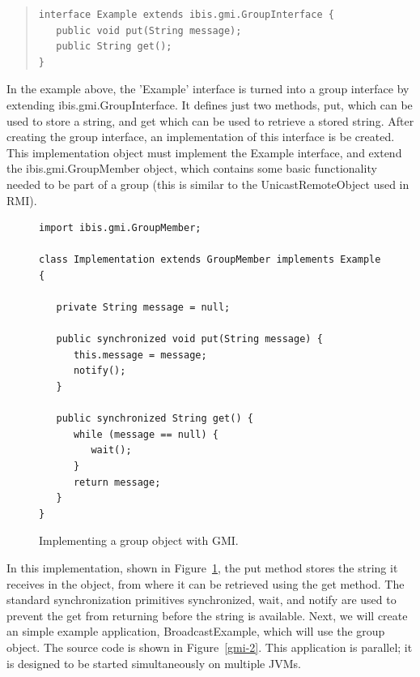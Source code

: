 \documentclass[10pt]{article}
\begin{document}
{\small
\begin{quote}
\begin{verbatim}
interface Example extends ibis.gmi.GroupInterface {
   public void put(String message);
   public String get();
}
\end{verbatim}
\end{quote}
}
\noindent

In the example above, the 'Example' interface is turned into a group
interface by extending ibis.gmi.GroupInterface. It defines just two
methods, put, which can be used to store a string, and get which can
be used to retrieve a stored string.  After creating the group
interface, an implementation of this interface is be created. This
implementation object must implement the Example interface, and extend
the ibis.gmi.GroupMember object, which contains some basic
functionality needed to be part of a group (this is similar to the
UnicastRemoteObject used in RMI).

\begin{figure}[t!]
{\small
\begin{verbatim}
import ibis.gmi.GroupMember;

class Implementation extends GroupMember implements Example {

   private String message = null;

   public synchronized void put(String message) {
      this.message = message;
      notify();
   }
   
   public synchronized String get() { 
      while (message == null) { 
         wait();
      }       
      return message;
   } 
}
\end{verbatim}
}
\caption{Implementing a group object with GMI.}
\label{gmi-1}
\end{figure}

In this implementation, shown in Figure~\ref{gmi-1}, the put method stores the
string it receives in the object, from where it can be retrieved using
the get method. The standard synchronization primitives synchronized,
wait, and notify are used to prevent the get from returning before the
string is available.  Next, we will create an simple example
application, BroadcastExample, which will use the group object. The
source code is shown in Figure~\ref{gmi-2}. This application is parallel; it is
designed to be started simultaneously on multiple JVMs.
\end{document}
